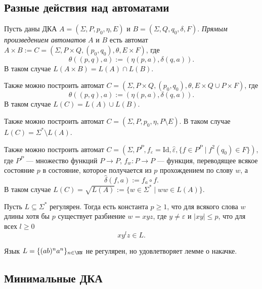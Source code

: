 \documentclass[12pt,a4paper]{article}
\newcommand{\Id}{\mathrm{Id}}
\begin{document}
    \subsection{Разные действия над автоматами}

    \begin{definition}
        Пусть даны ДКА $A = (\Sigma, P, p_0, \eta, E)$ и $B = (\Sigma, Q, q_0, \delta, F)$. \emph{Прямым произведением автоматов} $A$ и $B$ есть автомат $A \times B := C = (\Sigma, P \times Q, (p_0, q_0), \theta, E \times F)$, где
        \[\theta((p, q), a) := (\eta(p, a), \delta(q, a)).\]
        В таком случае $L(A \times B) = L(A) \cap L(B)$.

        Также можно построить автомат $C = (\Sigma, P \times Q, (p_0, q_0), \theta, E \times Q \cup P \times F)$, где
        \[\theta((p, q), a) := (\eta(p, a), \delta(q, a)).\]
        В таком случае $L(C) = L(A) \cup L(B)$.

        Также можно построить автомат $C = (\Sigma, P, p_0, \eta, P \setminus E)$. В таком случае $L(C) = \Sigma^* \setminus L(A)$.

        Также можно построить автомат $C = (\Sigma, P^P, f_\varepsilon = \Id, \widehat{\varepsilon}, \{f \in P^P \mid f^2(q_0) \in F\})$, где $P^P$ --- множество функций $P \to P$, $f_w: P \to P$ --- функция, переводящее всякое состояние $p$ в состояние, которое получается из $p$ прохождением по слову $w$, а
        \[\widehat{\delta}(f, a) := f_a \circ f.\]
        В таком случае $L(C) = \sqrt{L(A)} := \{w \in \Sigma^* \mid ww \in L(A)\}$.
    \end{definition}

    \begin{lemma}
        Пусть $L \subseteq \Sigma^*$ регулярен. Тогда есть константа $p \geqslant 1$, что для всякого слова $w$ длины хотя бы $p$ существует разбиение $w = xyz$, где $y \neq \varepsilon$ и $|xy| \leqslant p$, что для всех $l \geqslant 0$
        \[x y^l z \in L.\]
    \end{lemma}

    \begin{example}
        Язык $L = \{(ab)^n a^n\}_{n \in \NN}$ не регулярен, но удовлетворяет лемме о накачке.
    \end{example}

    \subsection{Минимальные ДКА}
\end{document}
